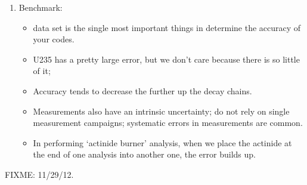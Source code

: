\documentclass{school-22.211-notes}
\begin{document}
\begin{enumerate}
\item Benchmark: 
  \begin{itemize}
  \item data set is the single most important things in determine the accuracy of your codes.
  \item U235 has a pretty large error, but we don't care because there is so little of it;
  \item Accuracy tends to decrease the further up the decay chains. 
  \item Measurements also have an intrinsic uncertainty; do not rely on single measurement campaigns; systematic errors in measurements are common. 
  \item In performing `actinide burner' analysis, when we place the actinide at the end of one analysis into another one, the error builds up. 
  \end{itemize}
\end{enumerate} 



\clearpage
{}
FIXME: 11/29/12. 
\end{document}
